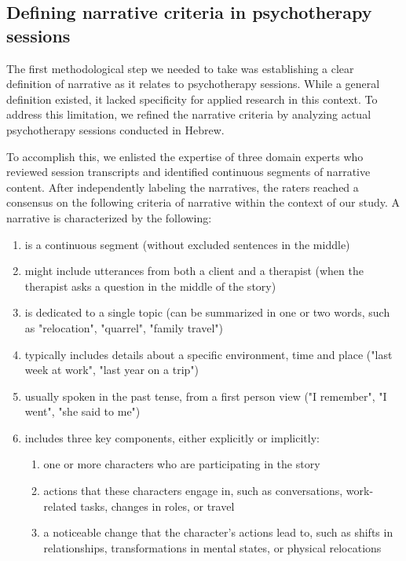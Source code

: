 \documentclass[preprint,12pt]{elsarticle}
\begin{document}
\subsection{Defining narrative criteria in psychotherapy sessions}

The first methodological step we needed to take was establishing  a clear definition of narrative as it relates to psychotherapy sessions. While a general definition existed, it lacked specificity for applied research in this context. To address this limitation, we refined the narrative criteria by analyzing actual psychotherapy sessions conducted in Hebrew.

To accomplish this, we enlisted the expertise of three domain experts who reviewed session transcripts and identified continuous segments of narrative content. After independently labeling the narratives, the raters reached a consensus on the following criteria of narrative within the context of our study. A narrative is characterized by the following:
\begin{enumerate}
   \item 
   is a continuous segment (without excluded sentences in the middle)
    \item 
 might include utterances from both a client and a therapist (when the therapist asks a question in the middle of the story)
  \item 
 is dedicated to a single topic (can be summarized in one or two words, such as "relocation", "quarrel", "family travel")
  \item  
  typically includes details about a specific environment, time and place ("last week at work", "last year on a trip")
  \item 
  usually spoken in the past tense, from a first person view ("I remember", "I went", "she said to me")
    \item 
 includes three key components, either explicitly or implicitly:
 \begin{enumerate}
 \item one or more characters who are participating in the story
 \item actions that these characters engage in, such as conversations, work-related tasks, changes in roles, or travel
 \item a noticeable change that the character's actions lead to, such as shifts in relationships, transformations in mental states, or physical relocations
 \end{enumerate}
\end{enumerate}
\end{document}
